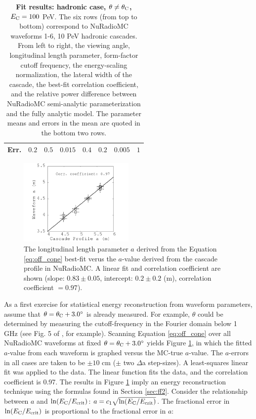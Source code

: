 \documentclass[amsmath,amssymb,aps,prd,10pt,twocolumn]{revtex4}
\begin{document}
\begin{table}
\begin{tabular}{|c|c|c|c|c|c|c|c|}
Err. & $0.2$ & $0.5$ & $0.015$ & $0.4$ & $0.2$ & $0.005$ & $1$ \\
\hline
\end{tabular}
\caption{\label{fit:tab:offcone_had} \textbf{Fit results: hadronic case, $\theta \neq \theta_{\rm C}$, $E_{\rm C} = 100$} PeV.  The six rows (from top to bottom) correspond to NuRadioMC waveforms 1-6, 10 PeV hadronic cascades.  From left to right, the viewing angle, longitudinal length parameter, form-factor cutoff frequency, the energy-scaling normalization, the lateral width of the cascade, the best-fit correlation coefficient, and the relative power difference between NuRadioMC semi-analytic parameterization and the fully analytic model.  The parameter means and errors in the mean are quoted in the bottom two rows.}
\end{table}
\endgroup

\begin{figure}
\centering
\includegraphics[width=0.5\textwidth]{Sept27_plot1.png}
\caption{\label{fit:fig:a_vs_a} The longitudinal length parameter $a$ derived from the Equation \ref{eq:off_cone} best-fit verus the $a$-value derived from the cascade profile in NuRadioMC.  A linear fit and correlation coefficient are shown (slope: $0.83\pm 0.05$, intercept: $0.2\pm 0.2$ (m), correlation coefficient $= 0.97$).}
\end{figure}

As a first exercise for statistical energy reconstruction from waveform parameters, assume that $\theta = \theta_{\rm C} + 3.0^{\circ}$ is already measured.  For example, $\theta$ could be determined by measuring the cutoff-frequency in the Fourier domain below 1 GHz (see Fig. 5 of \cite{10.1016/j.astropartphys.2017.03.008}, for example).  Scanning Equation \ref{eq:off_cone} over all NuRadioMC waveforms at fixed $\theta=\theta_{\rm C} + 3.0^{\circ}$ yields Figure \ref{fit:fig:a_vs_a}, in which the fitted $a$-value from each waveform is graphed versus the MC-true $a$-value.  The $a$-errors in all cases are taken to be $\pm 10$ cm ($\pm$ two $\Delta$a step-sizes).  A least-squares linear fit was applied to the data.  The linear function fits the data, and the correlation coefficient is 0.97.  The results in Figure \ref{fit:fig:a_vs_a} imply an energy reconstruction technique using the formulas found in Section \ref{sec:ff2}.  Consider the relationship between $a$ and $\ln(E_{\rm C}/E_{\rm crit})$: $a = c_1 \sqrt{\ln(E_{\rm C}/E_{\rm crit})}$.  The fractional error in $\ln(E_{\rm C}/E_{\rm crit})$ is proportional to the fractional error in $a$:
\end{document}
